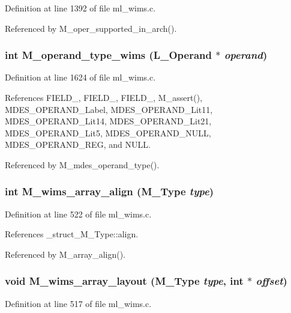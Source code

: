 Definition at line 1392 of file ml\_\-wims.c.

Referenced by M\_\-oper\_\-supported\_\-in\_\-arch().
\subsubsection{\setlength{\rightskip}{0pt plus 5cm}int M\_\-operand\_\-type\_\-wims (L\_\-Operand $\ast$ {\em operand})}\label{ml__wims_8c_a988cb6cc1f684e36ef347b82cc8aa3d}




Definition at line 1624 of file ml\_\-wims.c.

References FIELD\_, FIELD\_, FIELD\_, M\_\-assert(), MDES\_\-OPERAND\_\-Label, MDES\_\-OPERAND\_\-Lit11, MDES\_\-OPERAND\_\-Lit14, MDES\_\-OPERAND\_\-Lit21, MDES\_\-OPERAND\_\-Lit5, MDES\_\-OPERAND\_\-NULL, MDES\_\-OPERAND\_\-REG, and NULL.

Referenced by M\_\-mdes\_\-operand\_\-type().
\subsubsection{\setlength{\rightskip}{0pt plus 5cm}int M\_\-wims\_\-array\_\-align (\bf{M\_\-Type} {\em type})}\label{ml__wims_8c_153212309df8267a4886711a49217400}




Definition at line 522 of file ml\_\-wims.c.

References \_\-struct\_\-M\_\-Type::align.

Referenced by M\_\-array\_\-align().
\subsubsection{\setlength{\rightskip}{0pt plus 5cm}void M\_\-wims\_\-array\_\-layout (\bf{M\_\-Type} {\em type}, int $\ast$ {\em offset})}\label{ml__wims_8c_61439c16abd828917d3676fc9b64546b}




Definition at line 517 of file ml\_\-wims.c.

